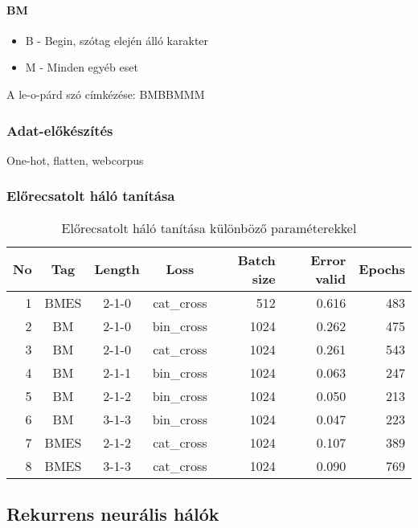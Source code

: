 \documentclass[a4paper, magyar]{article}
\begin{document}
\paragraph{BM}
\begin{itemize}
	\item B - Begin, szótag elején álló karakter
	\item M - Minden egyéb eset
\end{itemize}
A
{\selectfont
	le-o-párd%
}
szó címkézése:
{\selectfont
	BMBBMMM%
}
\subsubsection{Adat-előkészítés}
One-hot, flatten, webcorpus
\subsubsection{Előrecsatolt háló tanítása}
\begin{table}[h]\centering
	\begin{tabular}{|r|c|c|c|r|r|r|}
		\hline
		No&Tag&Length&Loss&Batch size&Error valid&Epochs\\
		\hline
		1&BMES&2-1-0&cat\_cross&512&0.616&483\\ 
		\hline
		2&BM&2-1-0&bin\_cross&1024&0.262&475\\
		\hline
		3&BM&2-1-0&cat\_cross&1024&0.261&543\\
		\hline
		4&BM&2-1-1&bin\_cross&1024&0.063&247\\
		\hline
		5&BM&2-1-2&bin\_cross&1024&0.050&213\\
		\hline
		6&BM&3-1-3&bin\_cross&1024&0.047&223\\
		\hline
		7&BMES&2-1-2&cat\_cross&1024&0.107&389\\
		\hline
		8&BMES&3-1-3&cat\_cross&1024&0.090&769\\
		\hline
	\end{tabular}
	\caption{Előrecsatolt háló tanítása különböző paraméterekkel}
\end{table}
\subsection{Rekurrens neurális hálók}



\end{document}
